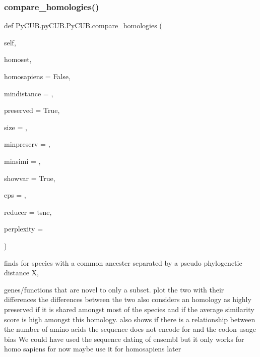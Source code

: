\subsubsection{\texorpdfstring{compare\+\_\+homologies()}{compare\_homologies()}}
{\footnotesize\ttfamily def Py\+C\+U\+B.\+py\+C\+U\+B.\+Py\+C\+U\+B.\+compare\+\_\+homologies (\begin{DoxyParamCaption}\item[{}]{self,  }\item[{}]{homoset,  }\item[{}]{homosapiens = {\ttfamily False},  }\item[{}]{mindistance = {},  }\item[{}]{preserved = {\ttfamily True},  }\item[{}]{size = {},  }\item[{}]{minpreserv = {},  }\item[{}]{minsimi = {},  }\item[{}]{showvar = {\ttfamily True},  }\item[{}]{eps = {},  }\item[{}]{reducer = {\ttfamily \textquotesingle{}tsne\textquotesingle{}},  }\item[{}]{perplexity = {} }\end{DoxyParamCaption})}



finds for species with a common ancester separated by a pseudo phylogenetic distance X, 

genes/functions that are novel to only a subset. plot the two with their differences the differences between the two also considers an homology as highly preserved if it is shared amongst most of the species and if the average similarity score is high amongst this homology. also shows if there is a relationship between the number of amino acids the sequence does not encode for and the codon usage bias We could have used the sequence dating of ensembl but it only works for homo sapiens for now maybe use it for homosapiens later


